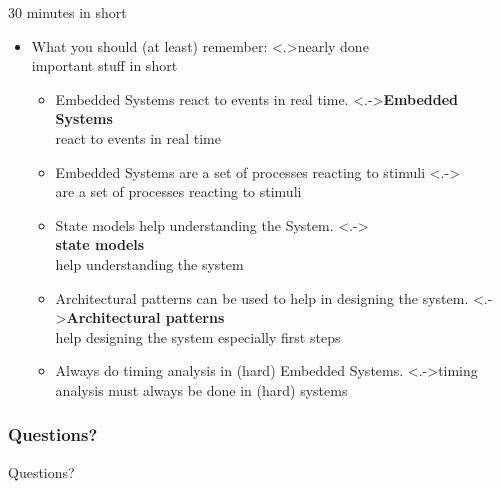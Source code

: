 \documentclass[ngerman={babel}, utf8, bigger, t, xcolor={table,dvipsnames}, ompress, hyperref={bookmarks,colorlinks},red]{beamer}
\begin{document}
\begin{frame}{30 minutes in short}
	\begin{itemize}
		\item What you should (at least) remember:
		\note<.>{nearly done \\ important stuff in short}
		\begin{itemize}
			\item Embedded Systems react to events in real time.
			\note<.->{\textbf{Embedded Systems} \\ react to events in real time}
			\item Embedded Systems are a set of processes reacting to stimuli
			\note<.->{\\ are a set of processes reacting to stimuli}
			\item State models help understanding the System.
			\note<.->{\\ \textbf{state models}\\ help understanding the system}
			\item Architectural patterns can be used to help in designing the system.
			\note<.->{\textbf{Architectural patterns} \\ help designing the system {\tiny especially first steps}}
			\item Always do timing analysis in (hard) Embedded Systems.
			\note<.->{timing analysis must always be done in (hard) systems}
		\end{itemize}
	\end{itemize}
\end{frame}

\begin{frame}[c]
\frametitle{Questions?}
	\centerline{\Huge Questions?}
\end{frame}
\end{document}
